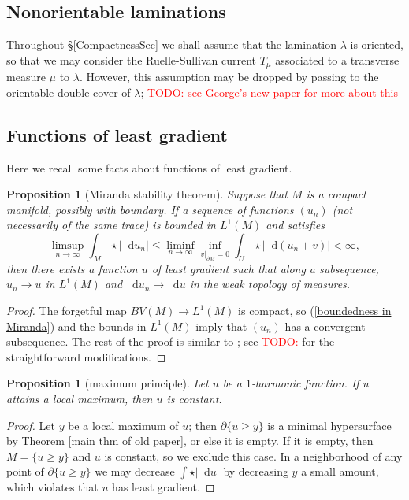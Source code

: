 \documentclass[reqno,11pt]{amsart}
\newcommand*\dif{\mathop{}\!\mathrm{d}}
\newtheorem{proposition}[theorem]{Proposition}
\theoremstyle{definition}
\numberwithin{equation}{section}
\newcommand\todo[1]{\textcolor{red}{TODO: #1}}
\begin{document}
\subsection{Nonorientable laminations}\label{nonorientable section}
Throughout \S\ref{CompactnessSec} we shall assume that the lamination $\lambda$ is oriented, so that we may consider the Ruelle-Sullivan current $T_\mu$ associated to a transverse measure $\mu$ to $\lambda$.
However, this assumption may be dropped by passing to the orientable double cover of $\lambda$; \todo{see George's new paper for more about this}

\subsection{Functions of least gradient}
Here we recall some facts about functions of least gradient.

\begin{proposition}[Miranda stability theorem]
  Suppose that $M$ is a compact manifold, possibly with boundary.
	If a sequence of functions $(u_n)$ (not necessarily of the same trace) is bounded in $L^1(M)$ and satisfies
\begin{equation}\label{boundedness in Miranda}
	\limsup_{n \to \infty} \int_M \star |\dif u_n| \leq \liminf_{n \to \infty} \inf_{v|_{\partial M} = 0} \int_U \star |\dif(u_n + v)| < \infty,
\end{equation}
	then there exists a function $u$ of least gradient such that along a subsequence, $u_n \to u$ in $L^1(M)$ and $\dif u_n \to \dif u$ in the weak topology of measures.
\end{proposition}
\begin{proof}
The forgetful map $BV(M) \to L^1(M)$ is compact, so (\ref{boundedness in Miranda}) and the bounds in $L^1(M)$ imply that $(u_n)$ has a convergent subsequence.
The rest of the proof is similar to \cite[Teorema 3 and Osservazione 3]{Miranda67}; see \todo{\cite{BackusFLG}} for the straightforward modifications.
\end{proof}

\begin{proposition}[maximum principle]\label{max princip}
Let $u$ be a $1$-harmonic function.
If $u$ attains a local maximum, then $u$ is constant.
\end{proposition}
\begin{proof}
Let $y$ be a local maximum of $u$; then $\partial \{u \geq y\}$ is a minimal hypersurface by Theorem \ref{main thm of old paper}, or else it is empty. If it is empty, then $M = \{u \geq y\}$ and $u$ is constant, so we exclude this case.
In a neighborhood of any point of $\partial \{u \geq y\}$ we may decrease $\int \star |\dif u|$ by decreasing $y$ a small amount, which violates that $u$ has least gradient.
\end{proof}
\end{document}
